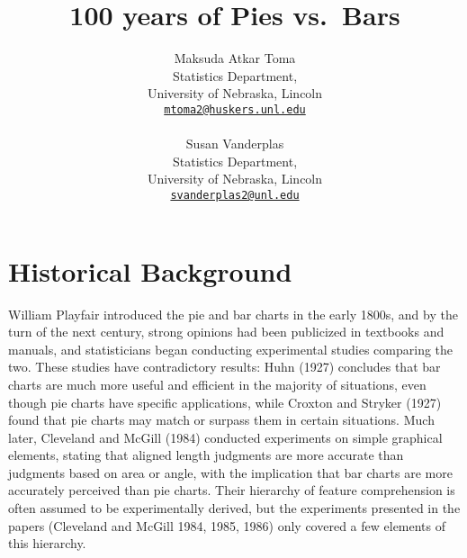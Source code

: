 \documentclass[
  10pt,
  letterpaper,
  twocolumn]{article}
\title{100 years of Pies vs.~Bars}
\author{
Maksuda Atkar Toma\\
Statistics Department, \\University of Nebraska, Lincoln\\
{\tt \href{mailto:mtoma2@huskers.unl.edu}{mtoma2@huskers.unl.edu}}\\
\\\And
Susan Vanderplas\\
Statistics Department, \\University of Nebraska, Lincoln\\
{\tt \href{mailto:svanderplas2@unl.edu}{svanderplas2@unl.edu}}\\
}
\date{}
\newcommand{\svp}[1]{{\textcolor{RedOrange}{#1}}}
\begin{document}
\maketitle
\ifdefined\Shaded\renewenvironment{Shaded}{\begin{tcolorbox}[enhanced, sharp corners, interior hidden, boxrule=0pt, borderline west={3pt}{0pt}{shadecolor}, frame hidden, breakable]}{\end{tcolorbox}}\fi

\hypertarget{historical-background}{%
\section{Historical Background}\label{historical-background}}

William Playfair introduced the pie and bar charts in the early
1800s\svp{, and by the turn of the next century, strong opinions had
been publicized in textbooks and manuals, and statisticians began
conducting experimental studies comparing the two.} \svp{These studies
have contradictory results:} Huhn (1927) concludes that bar charts are
much more useful and efficient in the majority of situations, even
though pie charts have specific applications\svp{, while Croxton and
Stryker (1927) found that pie charts may match or surpass them in
certain situations.} \svp{Much later, Cleveland and McGill (1984)
conducted experiments on simple graphical elements, stating that aligned
length judgments are more accurate than judgments based on area or
angle, with the implication that bar charts are more accurately
perceived than pie charts.} \svp{Their hierarchy of feature
comprehension is often assumed to be experimentally derived, but the
experiments presented in the papers (Cleveland and McGill 1984, 1985,
1986) only covered a few elements of this hierarchy.}
\end{document}
